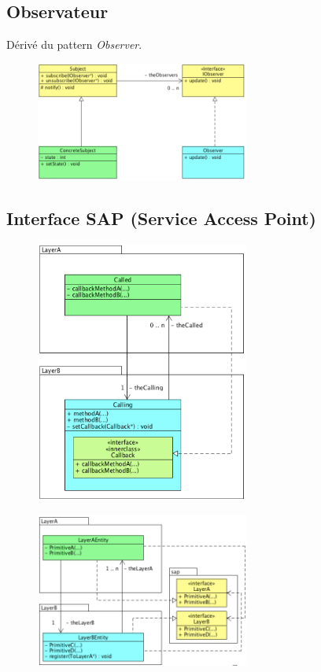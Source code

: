 \subsection{Observateur}
Dérivé du pattern \textit{Observer}.
\begin{figure}[H]
    \centering
    \includegraphics[width=7.00cm]{figures/observer.png}
\end{figure}
%
\subsection{Interface SAP (Service Access Point)}
\begin{figure}[H]
    \centering
    \includegraphics[width=7.00cm]{figures/SAP_1.png}
\end{figure}
\begin{figure}[H]
    \centering
    \includegraphics[width=7.00cm]{figures/SAP_2.png}
\end{figure}
